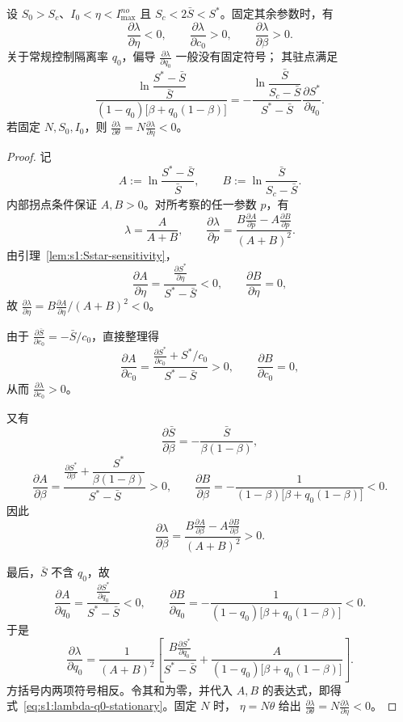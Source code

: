 \documentclass[lang=cn,a4paper,newtx]{elegantpaper}
\numberwithin{equation}{section}
\theoremstyle{plain}
\begin{document}
\begin{proposition}
\label{prop:s1:lambda-sensitivity}
设 $S_0>S_c$、$I_0<\eta<I_{\max}^{no}$ 且 $S_c<2\bar S<S^*$。固定其余参数时，有
\[
\frac{\partial \lambda}{\partial \eta}<0,
\qquad
\frac{\partial \lambda}{\partial c_0}>0,
\qquad
\frac{\partial \lambda}{\partial \beta}>0.
\]
关于常规控制隔离率 $q_0$，偏导 $\frac{\partial \lambda}{\partial q_0}$ 一般没有固定符号；
其驻点满足
\begin{equation}
\frac{
\ln\dfrac{S^*-\bar S}{\bar S}
}{
(1-q_0)\bigl[\beta+q_0(1-\beta)\bigr]
}
=
-
\frac{
\ln\dfrac{\bar S}{S_c-\bar S}
}{
S^*-\bar S
}
\frac{\partial S^*}{\partial q_0}.
\label{eq:s1:lambda-q0-stationary}
\end{equation}
若固定 $N,S_0,I_0$，则
$\frac{\partial \lambda}{\partial \theta}=N\frac{\partial \lambda}{\partial \eta}<0$。
\end{proposition}

\begin{proof}
记
\[
A:=
\ln\frac{S^*-\bar S}{\bar S},
\qquad
B:=
\ln\frac{\bar S}{S_c-\bar S}.
\]
内部拐点条件保证 $A,B>0$。对所考察的任一参数 $p$，有
\[
\lambda=\frac{A}{A+B},
\qquad
\frac{\partial \lambda}{\partial p}
=
\frac{B\frac{\partial A}{\partial p}-A\frac{\partial B}{\partial p}}{(A+B)^2}.
\]
由引理~\ref{lem:s1:Sstar-sensitivity}，
\[
\frac{\partial A}{\partial \eta}
=
\frac{\frac{\partial S^*}{\partial \eta}}{S^*-\bar S}<0,
\qquad
\frac{\partial B}{\partial \eta}=0,
\]
故 $\frac{\partial \lambda}{\partial \eta}=B\frac{\partial A}{\partial \eta}/(A+B)^2<0$。

由于 $\frac{\partial \bar S}{\partial c_0}=-\bar S/c_0$，直接整理得
\[
\frac{\partial A}{\partial c_0}
=
\frac{\frac{\partial S^*}{\partial c_0}+S^*/c_0}{S^*-\bar S}>0,
\qquad
\frac{\partial B}{\partial c_0}=0,
\]
从而 $\frac{\partial \lambda}{\partial c_0}>0$。

又有
\[
\frac{\partial \bar S}{\partial \beta}
=
-\frac{\bar S}{\beta(1-\beta)},
\]
\[
\frac{\partial A}{\partial \beta}
=
\frac{
\frac{\partial S^*}{\partial \beta}+\dfrac{S^*}{\beta(1-\beta)}
}{
S^*-\bar S
}>0,
\qquad
\frac{\partial B}{\partial \beta}
=
-\frac{1}{
(1-\beta)\bigl[\beta+q_0(1-\beta)\bigr]
}<0.
\]
因此
\[
\frac{\partial \lambda}{\partial \beta}
=
\frac{B\frac{\partial A}{\partial \beta}-A\frac{\partial B}{\partial \beta}}{(A+B)^2}>0.
\]

最后，$\bar S$ 不含 $q_0$，故
\[
\frac{\partial A}{\partial q_0}
=
\frac{\frac{\partial S^*}{\partial q_0}}{S^*-\bar S}<0,
\qquad
\frac{\partial B}{\partial q_0}
=
-\frac{1}{
(1-q_0)\bigl[\beta+q_0(1-\beta)\bigr]
}<0.
\]
于是
\[
\frac{\partial \lambda}{\partial q_0}
=
\frac{1}{(A+B)^2}
\left[
\frac{B \frac{\partial S^*}{\partial q_0}}{S^*-\bar S}
+
\frac{A}{
(1-q_0)\bigl[\beta+q_0(1-\beta)\bigr]
}
\right].
\]
方括号内两项符号相反。令其和为零，并代入 $A,B$ 的表达式，即得
式~\eqref{eq:s1:lambda-q0-stationary}。固定 $N$ 时，
$\eta=N\theta$ 给出 $\frac{\partial \lambda}{\partial \theta}=N\frac{\partial \lambda}{\partial \eta}<0$。
\end{proof}
\end{document}
